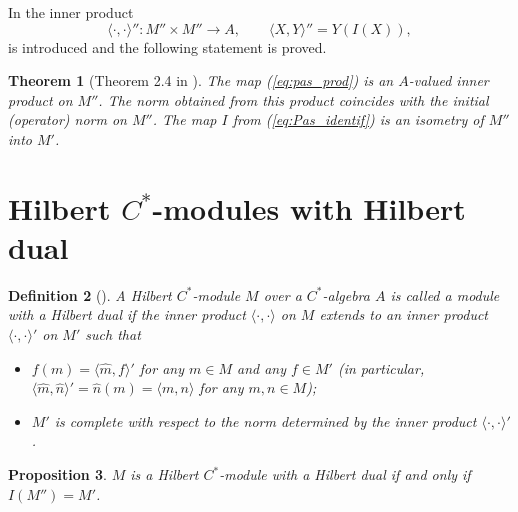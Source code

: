 \documentclass[12pt]{amsart}
\newtheorem{teo}{Theorem}%
\newtheorem{prop}[teo]{Proposition}
\newtheorem{dfn}[teo]{Definition}
\def\<{\langle}
\def\>{\rangle}
\begin{document}
In  \cite{Pas2} the inner product 
\begin{equation}\label{eq:pas_prod}
\<\cdot,\cdot\>'': M'' \times M'' \to A, \qquad \<X,Y\>''=Y(I(X)),
\end{equation}
is introduced and the following statement is proved.
\begin{teo}[Theorem 2.4 in \cite{Pas2}]\label{teo:pasc}
The map \emph{(\ref{eq:pas_prod})} is an $A$-valued inner product on $M''$. The norm obtained from this product coincides with the initial (operator) norm on $M''$. The map $I$ from \emph{(\ref{eq:Pas_identif})} is an isometry of $M''$ into $M'$. 
\end{teo}


\section{Hilbert $C^*$-modules with Hilbert dual}



\begin{dfn}[\cite{Manuilov2022}]\label{def}\rm
A Hilbert $C^*$-module $M$ over a $C^*$-algebra $A$ is called a \textit{module with a Hilbert dual} if the inner product $\langle\cdot,\cdot\rangle$ on $M$ extends to an inner product $\langle\cdot,\cdot\rangle'$ on $M'$ such that 
\begin{itemize}
\item
$f(m)=\langle \widehat m,f\rangle'$ for any $m\in M$ and any $f\in M'$ (in particular, $\langle \widehat m,\widehat n\rangle'=\widehat n(m)=\langle m,n\rangle$ for any $m,n\in M$);
\item
$M'$ is complete with respect to the norm determined by the inner product $\langle\cdot,\cdot\rangle'$.
\end{itemize}
\end{dfn}

\begin{prop}
$M$ is a Hilbert $C^*$-module with a Hilbert dual if and only if $I(M'')=M'$.
\end{prop}
\end{document}

